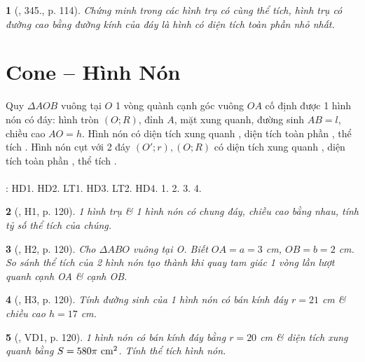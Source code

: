 \documentclass{article}
\newtheorem{baitoan}{}
\begin{document}
\begin{baitoan}[\cite{Binh_Toan_9_tap_2}, 345., p. 114]
	Chứng minh trong các hình trụ có cùng thể tích, hình trụ có đường cao bằng đường kính của đáy là hình có diện tích toàn phần nhỏ nhất.
\end{baitoan}


\section{Cone -- Hình Nón}
 Quy $\Delta AOB$ vuông tại $O$ 1 vòng quành cạnh góc vuông $OA$ cố định được 1 hình nón có đáy: hình tròn $(O;R)$, đỉnh $A$, mặt xung quanh, đường sinh $AB = l$, chiều cao $AO = h$.  Hình nón có diện tích xung quanh , diện tích toàn phần , thể tích .  Hình nón cụt với 2 đáy $(O';r),(O;R)$ có diện tích xung quanh , diện tích toàn phần , thể tích .\\
\\
\cite[Chap. X, \S2, pp. 98--103]{SGK_Toan_9_Canh_Dieu_tap_1}: HD1. HD2. LT1. HD3. LT2. HD4. 1. 2. 3. 4.

\begin{baitoan}[\cite{Binh_boi_duong_Toan_9_tap_2}, H1, p. 120]
	1 hình trụ \& 1 hình nón có chung đáy, chiều cao bằng nhau, tính tỷ số thể tích của chúng.
\end{baitoan}

\begin{baitoan}[\cite{Binh_boi_duong_Toan_9_tap_2}, H2, p. 120]
	Cho $\Delta ABO$ vuông tại O. Biết $OA = a = 3$ {\rm cm}, $OB = b = 2$ {\rm cm}. So sánh thể tích của 2 hình nón tạo thành khi quay tam giác 1 vòng lần lượt quanh cạnh OA \& cạnh OB.
\end{baitoan}

\begin{baitoan}[\cite{Binh_boi_duong_Toan_9_tap_2}, H3, p. 120]
	Tính đường sinh của 1 hình nón có bán kính đáy $r = 21$ {\rm cm} \& chiều cao $h = 17$ {\rm cm}.
\end{baitoan}

\begin{baitoan}[\cite{Binh_boi_duong_Toan_9_tap_2}, VD1, p. 120]
	1 hình nón có bán kính đáy bằng $r = 20$ {\rm cm} \& diện tích xung quanh bằng $S = 580\pi\ {\rm cm}^2$. Tính thể tích hình nón.
\end{baitoan}
\end{document}
